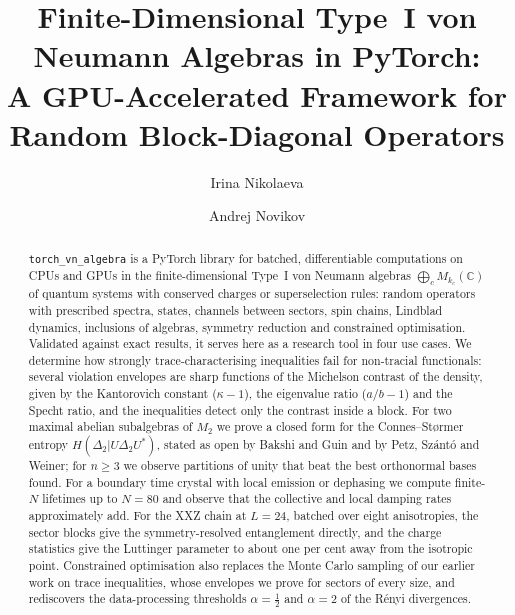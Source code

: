 \documentclass[11pt]{article}
\title{Finite-Dimensional Type~I von Neumann Algebras in PyTorch:\\
A GPU-Accelerated Framework for Random Block-Diagonal Operators}
\author{Irina Nikolaeva \and Andrej Novikov}
\date{}
\newcommand{\C}{\mathbb{C}}
\begin{document}
\maketitle

\begin{abstract}
\texttt{torch\_vn\_algebra} is a PyTorch library for batched, differentiable computations on CPUs and GPUs in the
finite-dimensional Type~I von Neumann algebras $\bigoplus_cM_{k_c}(\C)$ of quantum systems with conserved charges or
superselection rules: random operators with prescribed spectra, states, channels between sectors, spin chains, Lindblad
dynamics, inclusions of algebras, symmetry reduction and constrained optimisation. Validated against exact results, it
serves here as a research tool in four use cases. We determine how strongly trace-characterising inequalities fail
for non-tracial functionals: several violation envelopes are sharp functions of the Michelson contrast of the
density, given by the Kantorovich constant ($\kappa-1$), the eigenvalue ratio ($a/b-1$) and the Specht ratio, and the
inequalities detect only the contrast inside a block. For two maximal abelian subalgebras of $M_2$ we prove a closed
form for the Connes--St{\o}rmer entropy $H(\Delta_2|U\Delta_2U^*)$, stated as open by Bakshi and Guin and by Petz,
Sz\'ant\'o and Weiner; for $n\ge3$ we observe partitions of unity that beat the best orthonormal bases found. For a
boundary time crystal with local emission or dephasing we compute finite-$N$ lifetimes up to $N=80$ and observe that
the collective and local damping rates approximately add. For the XXZ chain at $L=24$, batched over eight anisotropies, the
sector blocks give the symmetry-resolved entanglement directly, and the charge statistics give the Luttinger parameter
to about one per cent away from the isotropic point. Constrained optimisation also replaces the Monte Carlo sampling of our
earlier work on trace inequalities, whose envelopes we prove for sectors of every size, and rediscovers the
data-processing thresholds $\alpha=\frac12$ and $\alpha=2$ of the Rényi divergences.
\end{abstract}
\end{document}
